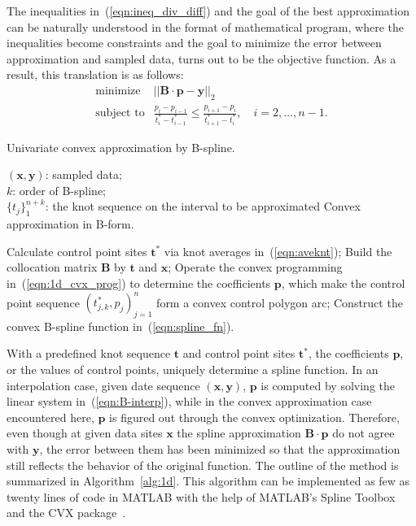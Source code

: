 \documentclass{sig-alternate}
\newcommand{\vectort}{\mathbf{t}}
\newcommand{\vectortstar}{\mathbf{t}^*}
\newcommand{\vectorx}{\mathbf{x}}
\newcommand{\vectory}{\mathbf{y}}
\newcommand{\matrixB}{\mathbf{B}}
\newcommand{\vectorp}{\mathbf{p}}
\newcommand{\BEGIN}{\item[\textbf{Begin}]}
\newcommand{\END}{\item[\textbf{End}]}
\begin{document}
The inequalities in~(\ref{eqn:ineq_div_diff}) and the goal of the best
approximation can be naturally understood in the format of
mathematical program, where the inequalities become constraints and
the goal to minimize the error between approximation and
sampled data, turns out to be the objective function. As a result,
this translation is as follows:
\begin{equation}\label{eqn:1d_cvx_prog}
\begin{array}{cl}
\mbox{minimize} & ||\matrixB \cdot \vectorp - \vectory||_2 \\
\mbox{subject to}& \frac{\displaystyle p_i-p_{i-1}}
                        {\displaystyle t_{i}^*-t_{i-1}^*} 
                   \leq
                   \frac{\displaystyle p_{i+1}-p_i}
                        {\displaystyle t_{i+1}^*-t_{i}^*},
                   \quad  i=2,\ldots,n-1. 
\end{array}
\end{equation}
\begin{algorithm}[!t]
\caption{Univariate convex approximation by B-spline.}
\label{alg:1d}
\begin{algorithmic}[1]
\REQUIRE $(\vectorx,\vectory)$: sampled data;\\$k$: order of B-spline;\\
         $\{t_j\}_1^{n+k}$: the knot sequence on the interval to be approximated
\ENSURE  Convex approximation in B-form.
\BEGIN
\STATE Calculate control point sites $\vectortstar$ via knot averages
       in~(\ref{eqn:aveknt}); 
\STATE Build the collocation matrix $\matrixB$
        by $\vectort$ and $\vectorx$; 
\STATE Operate the convex programming in~(\ref{eqn:1d_cvx_prog}) to
       determine the coefficients $\vectorp$, which make the
       control point sequence $(t_{j,k}^*,p_j)_{j=1}^n$ form
       a convex control polygon arc; 
\STATE Construct the convex B-spline function in~(\ref{eqn:spline_fn}).
\END
\end{algorithmic}
\end{algorithm}

With a predefined knot sequence $\vectort$ and control point sites
$\vectortstar$, the coefficients $\vectorp$, or the values 
of control points, uniquely determine a spline function. In an
interpolation case, given date sequence $(\vectorx,\vectory)$, 
$\vectorp$ is computed by solving the linear system
in~(\ref{eqn:B-interp}), while in the convex approximation case
encountered here, $\vectorp$ is figured out through the convex
optimization. Therefore, even though at given data sites $\vectorx$
the spline approximation $\matrixB \cdot \vectorp$ do not agree
with $\vectory$, the error between them has been
minimized so that the approximation still reflects the behavior of the
original function. The outline of the method is summarized in
Algorithm~\ref{alg:1d}. This algorithm can be implemented as few as
twenty lines of code in MATLAB with the help of MATLAB's Spline Toolbox
and the CVX package~\cite{cvx_pack}.  
\end{document}
